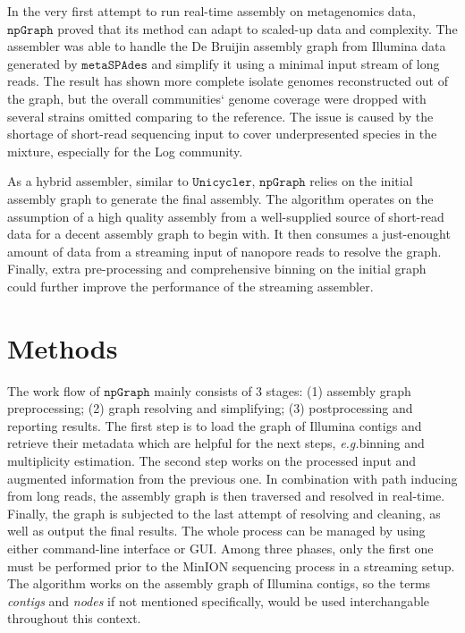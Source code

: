 \documentclass[10pt,twocolumn,twoside]{genpaper}
\newcommand{\npgraph}{$\mathtt{npGraph}$}
\newcommand{\unicycler}{$\mathtt{Unicycler}$}
\newcommand{\EG}{\emph{e.g.}}
\begin{document}
In the very first attempt to run real-time assembly on metagenomics data, \npgraph{} proved that its method can adapt to scaled-up data and complexity. The assembler was able to handle the De Bruijin assembly graph from Illumina data generated by $\mathtt{metaSPAdes}$ and simplify it using a minimal input stream of long reads. 
The result has shown more complete isolate genomes reconstructed out of the graph, but the overall communities` genome coverage were dropped with several strains omitted comparing to the reference. The issue is caused by the shortage of short-read sequencing input to cover underpresented species in the mixture, especially for the Log community.

As a hybrid assembler, similar to \unicycler{}, \npgraph{} relies on the initial assembly graph to generate the final assembly. The algorithm operates on the assumption of a high quality assembly from a well-supplied source of short-read data for a decent assembly graph to begin with.
It then consumes a just-enought amount of data from a streaming input of nanopore reads to resolve the graph. 
Finally, extra pre-processing and comprehensive binning on the initial graph could further improve the performance of the streaming assembler.


\section*{Methods}

The work flow of \npgraph{} mainly consists of 3 stages: (1) assembly graph preprocessing; (2) graph resolving and simplifying; (3) postprocessing and reporting results. 
The first step is to load the graph of Illumina contigs and retrieve their metadata which are helpful for the next steps, \EG binning and multiplicity estimation.
The second step works on the processed input and augmented information from the previous one. In combination with path inducing from long reads, the assembly graph is then traversed and resolved in real-time.
Finally, the graph is subjected to the last attempt of resolving and cleaning, as well as output the final results. The whole process can be managed by using either command-line interface or GUI.
Among three phases, only the first one must be performed prior to the MinION sequencing process in a streaming setup.
The algorithm works on the assembly graph of Illumina contigs, so the terms \emph{contigs} and \emph{nodes} if not mentioned specifically, would be used interchangable throughout this context.
\end{document}
